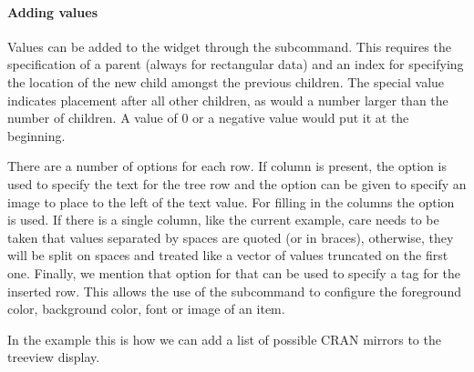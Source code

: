 \paragraph{Adding values}
Values can be added to the widget through the
subcommand. This requires the specification of a parent (always
\qcode{} for rectangular data) and an index for specifying the
location of the new child amongst the previous children. The special
value  indicates placement after all other children, as
would a number larger than the number of children. A value of 0 or a
negative value would put it at the beginning.

There are a number of options for each row. If column  is
present, the  option is used to specify the text for the
tree row and the option  can be given to specify an image
to place to the left of the text value. For filling in the columns the
 option is used. If there is a single column, like the
current example, care needs to be taken that values separated by
spaces are quoted (or in braces), otherwise, they will be split on
spaces and treated like a vector of values truncated on the first
one. Finally, we mention that  option for  that
can be used to specify a tag for the inserted row. This allows the use
of the subcommand  to configure
the foreground color, background color, font or image of an item.

In the example this is how we can add a list of possible CRAN mirrors
to the treeview display.
\begin{Schunk}
\end{Schunk}

